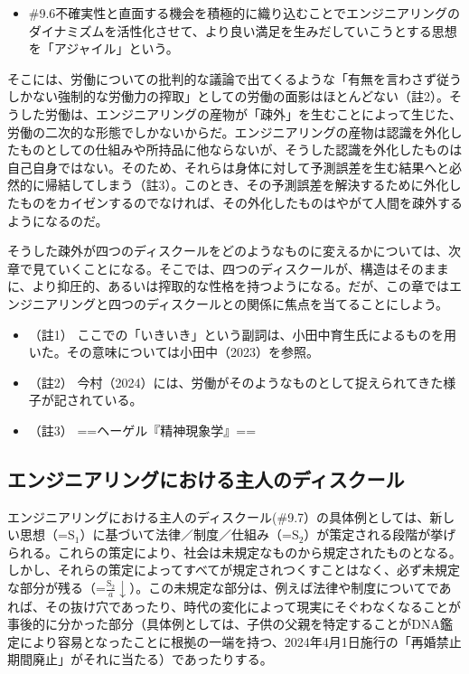 \begin{note}{}
  \begin{itemize}
    \tightlist
    \item{\#9.6}不確実性と直面する機会を積極的に織り込むことでエンジニアリングのダイナミズムを活性化させて、より良い満足を生みだしていこうとする思想を「アジャイル」という。
  \end{itemize}
\end{note}

そこには、労働についての批判的な議論で出てくるような「有無を言わさず従うしかない強制的な労働力の搾取」としての労働の面影はほとんどない（註2）。そうした労働は、エンジニアリングの産物が「疎外」を生むことによって生じた、労働の二次的な形態でしかないからだ。エンジニアリングの産物は認識を外化したものとしての仕組みや所持品に他ならないが、そうした認識を外化したものは自己自身ではない。そのため、それらは身体に対して予測誤差を生む結果へと必然的に帰結してしまう（註3）。このとき、その予測誤差を解決するために外化したものをカイゼンするのでなければ、その外化したものはやがて人間を疎外するようになるのだ。

そうした疎外が四つのディスクールをどのようなものに変えるかについては、次章で見ていくことになる。そこでは、四つのディスクールが、構造はそのままに、より抑圧的、あるいは搾取的な性格を持つようになる。だが、この章ではエンジニアリングと四つのディスクールとの関係に焦点を当てることにしよう。

\begin{itemize}
\tightlist
\item
  （註1）
  ここでの「いきいき」という副詞は、小田中育生氏によるものを用いた。その意味については小田中（2023）\cite{Odanaka}を参照。
\item
  （註2）
  今村（2024）\cite{Imamura}には、労働がそのようなものとして捉えられてきた様子が記されている。
\item
  （註3） ==ヘーゲル『精神現象学』==
\end{itemize}

\subsection{エンジニアリングにおける主人のディスクール}\label{ux30a8ux30f3ux30b8ux30cbux30a2ux30eaux30f3ux30b0ux306bux304aux3051ux308bux4e3bux4ebaux306eux30c7ux30a3ux30b9ux30afux30fcux30eb}

エンジニアリングにおける主人のディスクール(\#9.7）の具体例としては、新しい思想（=\(\textrm{S}_1\)）に基づいて法律／制度／仕組み（=\(\textrm{S}_2\)）が策定される段階が挙げられる。これらの策定により、社会は未規定なものから規定されたものとなる。しかし、それらの策定によってすべてが規定されつくすことはなく、必ず未規定な部分が残る（=\(\frac{\textrm{S}_2}{a}\downarrow\)）。この未規定な部分は、例えば法律や制度についてであれば、その抜け穴であったり、時代の変化によって現実にそぐわなくなることが事後的に分かった部分（具体例としては、子供の父親を特定することがDNA鑑定により容易となったことに根拠の一端を持つ、2024年4月1日施行の「再婚禁止期間廃止」がそれに当たる）であったりする。

